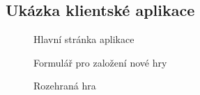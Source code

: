 \documentclass{article}
\begin{document}
\begin{appendices}
\section{Ukázka klientské aplikace}
\begin{figure}[!h]
\begin{center}
    \caption{Hlavní stránka aplikace}
    \label{fig:overview}
\end{center}
\end{figure}

\begin{figure}[!h]
\begin{center}
    \caption{Formulář pro založení nové hry}
    \label{fig:new_game}
\end{center}
\end{figure}

\begin{figure}[!h]
\begin{center}
    \caption{Rozehraná hra}
    \label{fig:game}
\end{center}
\end{figure}


\end{appendices}
\end{document}
